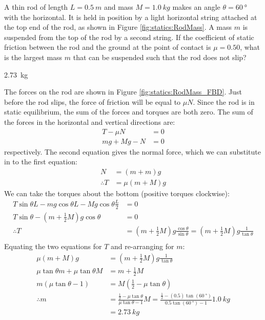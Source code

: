 \question A thin rod of length $L=\SI{0.5}{m}$ and mass $M=\SI{1.0}{kg}$ makes an angle $\theta=\SI{60}{\degree}$ with the horizontal. It is held in position by a light horizontal string attached at the top end of the rod, as shown in Figure \ref{fig:statics:RodMass}. A mass $m$ is suspended from the top of the rod by a second string. If the coefficient of static friction between the rod and the ground at the point of contact is $\mu=0.50$, what is the largest mass $m$ that can be suspended such that the rod does not slip?
\begin{finalanswer}
\SI{2.73}{kg}
\end{finalanswer}
\begin{solution}
The forces on the rod are shown in Figure \ref{fig:statics:RodMass_FBD}. Just before the rod slips, the force of friction will be equal to $\mu N$.
Since the rod is in static equilibrium, the sum of the forces and torques are both zero. The sum of the forces in the horizontal and vertical directions are:
\begin{align*}
T-\mu N&=0\\
mg+Mg-N&=0
\end{align*}
respectively.  The second equation gives the normal force, which we can substitute in to the first equation:
\begin{align*}
N&=(m+m)g\\
\therefore T&=\mu(m+M)g
\end{align*}
We can take the torques about the bottom (positive torques clockwise):
\begin{align*}
T\sin\theta L-mg\cos\theta L-Mg\cos\theta \frac{L}{2}&=0\\
T\sin\theta-(m+\frac{1}{2}M)g\cos\theta&=0\\
\therefore T&=(m+\frac{1}{2}M)g\frac{\cos\theta}{\sin\theta}=(m+\frac{1}{2}M)g\frac{1}{\tan\theta}\\
\end{align*}
Equating the two equations for $T$ and re-arranging for $m$:
\begin{align*}
\mu(m+M)g &= (m+\frac{1}{2}M)g\frac{1}{\tan\theta}\\
\mu\tan\theta m+\mu\tan\theta M&=m+\frac{1}{2}M\\
m(\mu\tan\theta-1) &= M(\frac{1}{2}-\mu\tan\theta)\\
\therefore m&= \frac{\frac{1}{2}-\mu\tan\theta}{\mu\tan\theta-1}M = \frac{\frac{1}{2}-(0.5)\tan(\SI{60}{\degree})}{0.5\tan(\SI{60}{\degree})-1}\SI{1.0}{kg}\\
&=\SI{2.73}{kg}
\end{align*}
\end{solution}